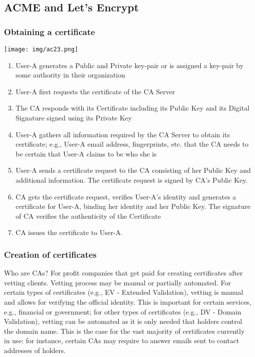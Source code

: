 \documentclass[a4paper, 10pt, titlepage]{article}
\begin{document}
\subsection{ACME and Let's Encrypt}
\subsubsection{Obtaining a certificate}

\begin{center}
\texttt{[image: img/ac23.png]}
\end{center}

\begin{enumerate}
\item User-A generates a Public and Private key-pair or is assigned a key-pair by some authority in their organization
\item User-A first requests the certificate of the CA Server
\item The CA responds with its Certificate including its Public Key and its Digital Signature signed using its Private Key
\item User-A gathers all information required by the CA Server to obtain its certificate; e.g., User-A email address, fingerprints, etc. that the CA needs to be certain that User-A claims to be who she is
\item User-A sends a certificate request to the CA consisting of her Public Key and additional information. The certificate request is signed by CA's Public Key.
\item CA gets the certificate request, verifies User-A's identity and generates a certificate for User-A, binding her identity and her Public Key. The signature of CA verifies the authenticity of the Certificate 
\item CA issues the certificate to User-A.
\end{enumerate}

\subsubsection{Creation of certificates}
Who are CAs? For profit companies that get paid for creating certificates after vetting clients. Vetting process may be manual or partially automated. For certain types of certificates (e.g., EV - Extended Validation), vetting is manual and allows for verifying the official identity. This is important for certain services, e.g., financial or government; for other types of certificates (e.g., DV - Domain Validation), vetting can be automated as it is only needed that holders control the domain name. This is the case for the vast majority of certificates currently in use: for instance, certain CAs may require to answer emails sent to contact addresses of holders.
\end{document}
